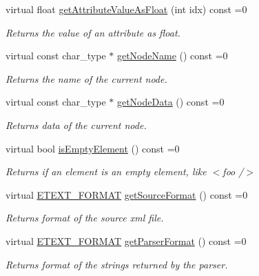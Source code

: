 \begin{DoxyCompactItemize}
virtual float \hyperlink{classirr_1_1io_1_1IIrrXMLReader_a3a01b3cec9db01d00928074846d39add}{get\+Attribute\+Value\+As\+Float} (int idx) const =0
\begin{DoxyCompactList}\small\item\em Returns the value of an attribute as float. \end{DoxyCompactList}\item 
virtual const char\+\_\+type $\ast$ \hyperlink{classirr_1_1io_1_1IIrrXMLReader_a7d745b130c895d0f910f191d04e20e87}{get\+Node\+Name} () const =0
\begin{DoxyCompactList}\small\item\em Returns the name of the current node. \end{DoxyCompactList}\item 
virtual const char\+\_\+type $\ast$ \hyperlink{classirr_1_1io_1_1IIrrXMLReader_aecbe0698e8f9acf88e27dd53da984210}{get\+Node\+Data} () const =0
\begin{DoxyCompactList}\small\item\em Returns data of the current node. \end{DoxyCompactList}\item 
\mbox{\label{classirr_1_1io_1_1IIrrXMLReader_a3c85b144e0376c9ff90bce1bbbc338a9}} 
virtual bool \hyperlink{classirr_1_1io_1_1IIrrXMLReader_a3c85b144e0376c9ff90bce1bbbc338a9}{is\+Empty\+Element} () const =0
\begin{DoxyCompactList}\small\item\em Returns if an element is an empty element, like $<$foo /$>$ \end{DoxyCompactList}\item 
virtual \hyperlink{namespaceirr_1_1io_ac7e51e5a6bd00451dec248f497b16a9d}{E\+T\+E\+X\+T\+\_\+\+F\+O\+R\+M\+AT} \hyperlink{classirr_1_1io_1_1IIrrXMLReader_a00998ef2d3a562d6b2b8302c3430322d}{get\+Source\+Format} () const =0
\begin{DoxyCompactList}\small\item\em Returns format of the source xml file. \end{DoxyCompactList}\item 
virtual \hyperlink{namespaceirr_1_1io_ac7e51e5a6bd00451dec248f497b16a9d}{E\+T\+E\+X\+T\+\_\+\+F\+O\+R\+M\+AT} \hyperlink{classirr_1_1io_1_1IIrrXMLReader_a9af7e323c292a4836bf4a7c093b4d85a}{get\+Parser\+Format} () const =0
\begin{DoxyCompactList}\small\item\em Returns format of the strings returned by the parser. \end{DoxyCompactList}\end{DoxyCompactItemize}


